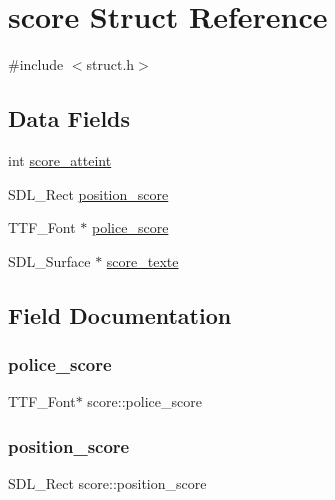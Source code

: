\hypertarget{structscore}{}\section{score Struct Reference}
\label{structscore}


{\ttfamily \#include $<$struct.\+h$>$}

\subsection*{Data Fields}
\begin{DoxyCompactItemize}
\item 
int \hyperlink{structscore_a86ee1f22a5bf4e92781f2b2165aa0859}{score\+\_\+atteint}
\item 
S\+D\+L\+\_\+\+Rect \hyperlink{structscore_a444e826e64d1abf14dc0108095752cc1}{position\+\_\+score}
\item 
T\+T\+F\+\_\+\+Font $\ast$ \hyperlink{structscore_aa8088c00f0a0ce91db39deb03afc7110}{police\+\_\+score}
\item 
S\+D\+L\+\_\+\+Surface $\ast$ \hyperlink{structscore_aa5918332d1797da4bedaccfce5446b88}{score\+\_\+texte}
\end{DoxyCompactItemize}


\subsection{Field Documentation}
\mbox{\label{structscore_aa8088c00f0a0ce91db39deb03afc7110}} 
\subsubsection{\texorpdfstring{police\+\_\+score}{police\_score}}
{\footnotesize\ttfamily T\+T\+F\+\_\+\+Font$\ast$ score\+::police\+\_\+score}

\mbox{\label{structscore_a444e826e64d1abf14dc0108095752cc1}} 
\subsubsection{\texorpdfstring{position\+\_\+score}{position\_score}}
{\footnotesize\ttfamily S\+D\+L\+\_\+\+Rect score\+::position\+\_\+score}

